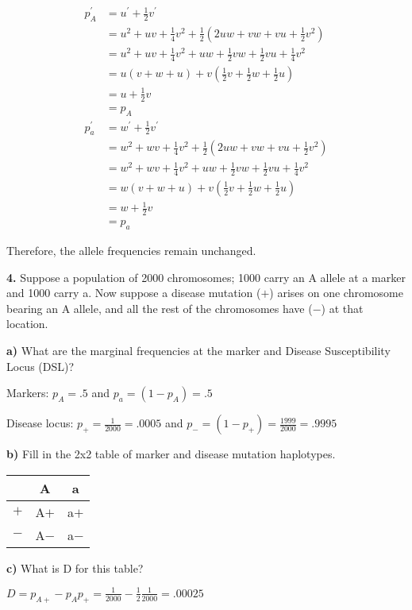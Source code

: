 \documentclass{essay}
\begin{document}
\begin{essaystyle}
\begin{align}
  p_A^\prime &= u^\prime + \frac{1}{2}v^\prime \\
  &= u^2 + uv + \frac{1}{4}v^2 + \frac{1}{2} (2uw + vw + vu + \frac{1}{2}v^2) \\
  &= u^2 + uv + \frac{1}{4}v^2 + uw + \frac{1}{2} vw + \frac{1}{2} vu + \frac{1}{4}v^2 \\
  &= u(v+w+u) + v(\frac{1}{2} v +\frac{1}{2}w + \frac{1}{2}u) \\
  &= u + \frac{1}{2} v \\
  &= p_A \\
  p_a^\prime &= w^\prime + \frac{1}{2}v^\prime \\
  &= w^2 + wv + \frac{1}{4}v^2 + \frac{1}{2} (2uw + vw + vu + \frac{1}{2}v^2 ) \\
  &= w^2 + wv + \frac{1}{4}v^2 + uw + \frac{1}{2} vw + \frac{1}{2} vu + \frac{1}{4}v^2 \\
  &= w(v+w+u) + v(\frac{1}{2} v +\frac{1}{2}w + \frac{1}{2}u) \\
  &= w + \frac{1}{2} v \\
  &= p_a
\end{align}

Therefore, the allele frequencies remain unchanged.

\textbf{4.} Suppose a population of 2000 chromosomes; 1000 carry an A allele at
a marker and 1000 carry a. Now suppose a disease mutation ($+$) arises on one
chromosome bearing an A allele, and all the rest of the chromosomes have ($-$) at
that location.

\indent\textbf{a)} What are the marginal frequencies at the marker and Disease
Susceptibility Locus (DSL)?

Markers: $p_A = .5$ and $p_a = (1-p_A) = .5$

Disease locus: $p_+ = \frac{1}{2000} = .0005$ and $p_- = (1-p_+) = \frac{1999}{2000} = .9995$

\textbf{b)} Fill in the 2x2 table of marker and disease mutation haplotypes.

\begin{tabular}{ l | c c }
      & A    & a \\ \hline
  $+$ & A$+$ & a$+$ \\
  $-$ & A$-$ & a$-$ \\
\end{tabular}

\textbf{c)} What is D for this table?

$D = p_{A+} - p_{A}p_{+} = \frac{1}{2000} - \frac{1}{2}\frac{1}{2000} = .00025$


\end{essaystyle}
\end{document}
